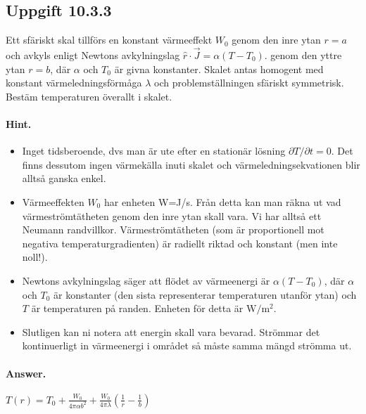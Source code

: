 \documentclass[%
oneside,                 %
final,                   %
10pt]{article}
\newenvironment{doconceexercise}{}{}
\newcounter{doconceexercisecounter}
\begin{document}
\begin{doconceexercise}

\subsection*{Uppgift 10.3.3}

Ett sfäriskt skal tillförs en konstant värmeeffekt $W_0$ genom den inre  ytan $r= a$ och avkyls enligt Newtons avkylningslag
$\hat r\cdot \vec J = \alpha\left(T-T_0\right)$.
genom den yttre ytan $r = b$, där $\alpha$ och $T_0$ är givna konstanter. Skalet antas homogent med konstant värmeledningsförmåga $\lambda$ och problemställningen sfäriskt symmetrisk. Bestäm temperaturen överallt i skalet.


\paragraph{Hint.}
\begin{itemize}
\item Inget tidsberoende, dvs man är ute efter en stationär lösning $\partial T / \partial t = 0$. Det finns dessutom ingen värmekälla inuti skalet och värmeledningsekvationen blir alltså ganska enkel.

\item Värmeeffekten $W_0$ har enheten W=J/s. Från detta kan man räkna ut vad värmeströmtätheten genom den inre ytan skall vara. Vi har alltså ett Neumann randvillkor. Värmeströmtätheten (som är proportionell mot negativa temperaturgradienten) är radiellt riktad och konstant (men inte noll!).

\item Newtons avkylningslag säger att flödet av värmeenergi är $\alpha(T-T_0)$, där $\alpha$ och $T_0$ är konstanter (den sista representerar temperaturen utanför ytan) och $T$ är temperaturen på randen. Enheten för detta är $\mathrm{W}/\mathrm{m}^2$.

\item Slutligen kan ni notera att energin skall vara bevarad. Strömmar det kontinuerligt in värmeenergi i området så måste samma mängd strömma ut.
\end{itemize}

\noindent


\paragraph{Answer.}
$T\left(r\right) = T_0 + \frac{W_0}{4\pi \alpha b^2} + \frac{W_0}{4\pi \lambda}
\left(\frac{1}{r} - \frac{1}{b}\right)$


\end{doconceexercise}
\end{document}
